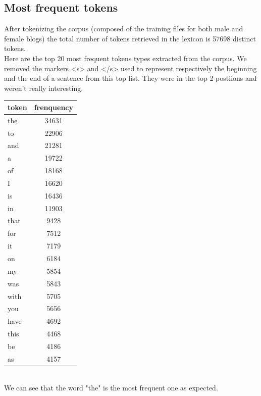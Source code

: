 \documentclass{eplDoc}
\begin{document}
\subsection{Most frequent tokens}
After tokenizing the corpus (composed of the training files for both male and female blogs) the total number of tokens retrieved in the lexicon is  57698  distinct tokens.  \\ 
Here are the top 20 most frequent tokens types extracted from the corpus. We removed the markers <s> and </s> used to represent respectively the beginning and the end of a sentence from this top list. They were in the top 2 postiions and weren't really interesting. \\ 
\begin{center}
		\begin{tabular}{|l|c|}
			\hline
			token & frenquency \\
			\hline
			the  &  34631 \\ 
			to  &  22906 \\ 
			and  &  21281 \\ 
			a  &  19722 \\ 
			of  &  18168 \\ 
			I  &  16620 \\ 
			is  &  16436 \\ 
			in  &  11903 \\ 
			that  &  9428 \\ 
			for  &  7512 \\ 
			it  &  7179 \\ 
			on  &  6184 \\ 
			my  &  5854 \\ 
			was  &  5843 \\ 
			with  &  5705 \\ 
			you  &  5656 \\ 
			have  &  4692 \\ 
			this  &  4468 \\ 
			be  &  4186 \\ 
			as  &  4157 \\ 
			\hline
		\end{tabular}
\end{center}
 \ \\ 
We can see that the word "the" is the most frequent one as expected. 
\end{document}
